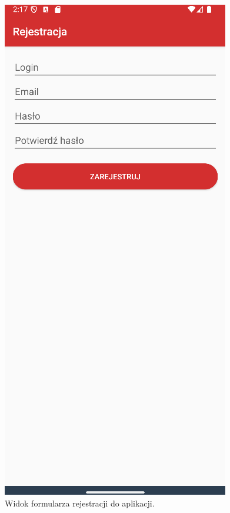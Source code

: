 \begin{figure}[H]
    \centering
    \includegraphics[scale=0.6]{img/imp/widok-reje.png}
    \caption{Widok formularza rejestracji do aplikacji.}
    \label{widok:register}
\end{figure}
